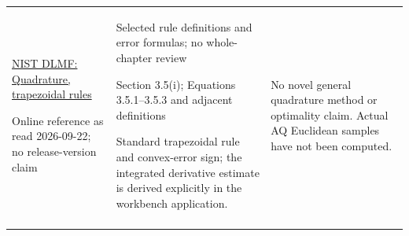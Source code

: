 \begin{longtable}{@{}p{43mm}p{65mm}p{44mm}@{}}
\href{https://dlmf.nist.gov/3.5}{NIST DLMF: Quadrature, trapezoidal rules}\par Online reference as read 2026-09-22; no release-version claim & Selected rule definitions and error formulas; no whole-chapter review\par Section 3.5(i); Equations 3.5.1--3.5.3 and adjacent definitions\par Standard trapezoidal rule and convex-error sign; the integrated derivative estimate is derived explicitly in the workbench application. & No novel general quadrature method or optimality claim. Actual AQ Euclidean samples have not been computed.\\\addlinespace
\bottomrule\end{longtable}\endgroup
{}
\par{}
